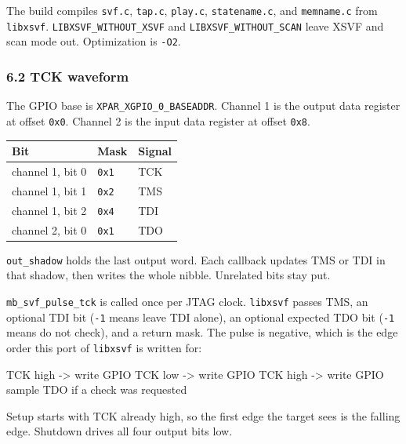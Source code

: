 \documentclass[
  11pt,
  a4paper,
]{article}
\newenvironment{Shaded}{}{}
\newcommand{\NormalTok}[1]{#1}
\newcounter{none} %
\begin{document}
The build compiles \texttt{svf.c}, \texttt{tap.c}, \texttt{play.c},
\texttt{statename.c}, and \texttt{memname.c} from \texttt{libxsvf}.
\texttt{LIBXSVF\_WITHOUT\_XSVF} and \texttt{LIBXSVF\_WITHOUT\_SCAN}
leave XSVF and scan mode out. Optimization is \texttt{-O2}.

\subsubsection{6.2 TCK waveform}\label{tck-waveform}

The GPIO base is \texttt{XPAR\_XGPIO\_0\_BASEADDR}. Channel 1 is the
output data register at offset \texttt{0x0}. Channel 2 is the input data
register at offset \texttt{0x8}.

{\def\LTcaptype{none} %
\begin{longtable}[]{@{}lll@{}}
\toprule\noalign{}
Bit & Mask & Signal \\
\midrule\noalign{}
\endhead
\bottomrule\noalign{}
\endlastfoot
channel 1, bit 0 & \texttt{0x1} & TCK \\
channel 1, bit 1 & \texttt{0x2} & TMS \\
channel 1, bit 2 & \texttt{0x4} & TDI \\
channel 2, bit 0 & \texttt{0x1} & TDO \\
\end{longtable}
}

\texttt{out\_shadow} holds the last output word. Each callback updates
TMS or TDI in that shadow, then writes the whole nibble. Unrelated bits
stay put.

\texttt{mb\_svf\_pulse\_tck} is called once per JTAG clock.
\texttt{libxsvf} passes TMS, an optional TDI bit (\texttt{-1} means
leave TDI alone), an optional expected TDO bit (\texttt{-1} means do not
check), and a return mask. The pulse is negative, which is the edge
order this port of \texttt{libxsvf} is written for:

\begin{Shaded}
\begin{Highlighting}[]
\NormalTok{TCK high  {-}\textgreater{}  write GPIO}
\NormalTok{TCK low   {-}\textgreater{}  write GPIO}
\NormalTok{TCK high  {-}\textgreater{}  write GPIO}
\NormalTok{sample TDO if a check was requested}
\end{Highlighting}
\end{Shaded}

Setup starts with TCK already high, so the first edge the target sees is
the falling edge. Shutdown drives all four output bits low.
\end{document}
